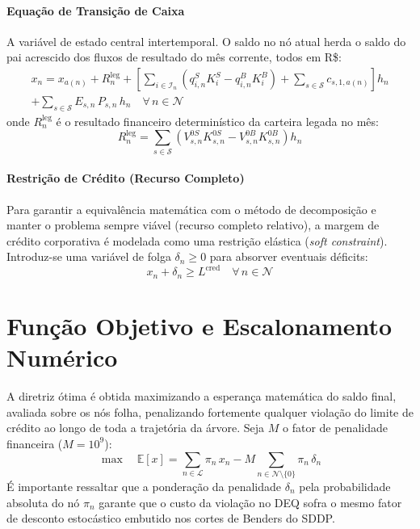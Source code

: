 \documentclass[12pt, a4paper]{article}
\begin{document}
\paragraph{Equação de Transição de Caixa}
A variável de estado central intertemporal. O saldo no nó atual herda o saldo do pai acrescido dos fluxos de resultado do mês corrente, todos em R\$:
\begin{multline}
    x_n = x_{a(n)} + R_n^{\text{leg}}
          + \left[ \sum_{i \in \mathcal{I}_n} \left(q_{i,n}^S K_i^S - q_{i,n}^B K_i^B\right) + \sum_{s \in \mathcal{S}} c_{s,1,a(n)} \right] h_n \\
          + \sum_{s \in \mathcal{S}} E_{s,n}\, P_{s,n}\, h_n
    \quad \forall\, n \in \mathcal{N}
\end{multline}
onde $R_n^{\text{leg}}$ é o resultado financeiro determinístico da carteira legada no mês:
\begin{equation}
    R_n^{\text{leg}} = \sum_{s \in \mathcal{S}} \left(V_{s,n}^{0S} K_{s,n}^{0S} - V_{s,n}^{0B} K_{s,n}^{0B}\right) h_n
\end{equation}

\paragraph{Restrição de Crédito (Recurso Completo)}
Para garantir a equivalência matemática com o método de decomposição e manter o problema sempre viável (recurso completo relativo), a margem de crédito corporativa é modelada como uma restrição elástica (\textit{soft constraint}). Introduz-se uma variável de folga $\delta_n \ge 0$ para absorver eventuais déficits:
\begin{equation}
    x_n + \delta_n \ge L^{\text{cred}} \quad \forall\, n \in \mathcal{N} \label{eq:credito}
\end{equation}

\section{Função Objetivo e Escalonamento Numérico}

A diretriz ótima é obtida maximizando a esperança matemática do saldo final, avaliada sobre os nós folha, penalizando fortemente qualquer violação do limite de crédito ao longo de toda a trajetória da árvore. Seja $M$ o fator de penalidade financeira ($M = 10^9$):
\begin{equation}
    \max \quad \mathbb{E}[x] = \sum_{n \in \mathcal{L}} \pi_n\, x_n - M \sum_{n \in \mathcal{N} \setminus \{0\}} \pi_n\, \delta_n
\end{equation}
É importante ressaltar que a ponderação da penalidade $\delta_n$ pela probabilidade absoluta do nó $\pi_n$ garante que o custo da violação no DEQ sofra o mesmo fator de desconto estocástico embutido nos cortes de Benders do SDDP.
\end{document}
